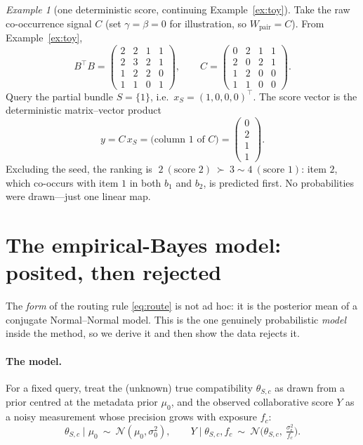 \documentclass[11pt]{article}
\theoremstyle{remark}
\newtheorem{example}{Example}
\newcommand{\xs}{x_S}
\begin{document}
\begin{example}[one deterministic score, continuing Example~\ref{ex:toy}]
Take the raw co-occurrence signal $C$ (set $\gamma=\beta=0$ for illustration, so $W_{\text{pair}}=C$). From
Example~\ref{ex:toy},
\[
  B^{\!\top}B=\begin{pmatrix}2&2&1&1\\2&3&2&1\\1&2&2&0\\1&1&0&1\end{pmatrix},
  \qquad
  C=\begin{pmatrix}0&2&1&1\\2&0&2&1\\1&2&0&0\\1&1&0&0\end{pmatrix}.
\]
Query the partial bundle $S=\{1\}$, i.e.\ $\xs=(1,0,0,0)^{\!\top}$. The score vector is the deterministic
matrix--vector product
\[
  y=C\,\xs=\text{(column 1 of }C)=\begin{pmatrix}0\\2\\1\\1\end{pmatrix}.
\]
Excluding the seed, the ranking is $\;2\ (\text{score }2)\ \succ\ 3\sim4\ (\text{score }1)$: item $2$, which
co-occurs with item $1$ in both $b_1$ and $b_2$, is predicted first. No probabilities were drawn---just one linear
map.
\end{example}

\section{The empirical-Bayes model: posited, then rejected}
\label{sec:eb}

The \emph{form} of the routing rule \eqref{eq:route} is not ad hoc: it is the posterior mean of a conjugate
Normal--Normal model. This is the one genuinely probabilistic \emph{model} inside the method, so we derive it and
then show the data rejects it.

\paragraph{The model.} For a fixed query, treat the (unknown) true compatibility $\theta_{S,c}$ as drawn from a
prior centred at the metadata prior $\mu_0$, and the observed collaborative score $Y$ as a noisy measurement whose
precision grows with exposure $f_c$:
\begin{equation}
  \theta_{S,c}\mid\mu_0 \ \sim\ \mathcal N(\mu_0,\sigma_0^2),
  \qquad
  Y\mid \theta_{S,c},f_c \ \sim\ \mathcal N\!\Big(\theta_{S,c},\ \tfrac{\sigma_\epsilon^2}{f_c}\Big).
  \label{eq:nnmodel}
\end{equation}
\end{document}
